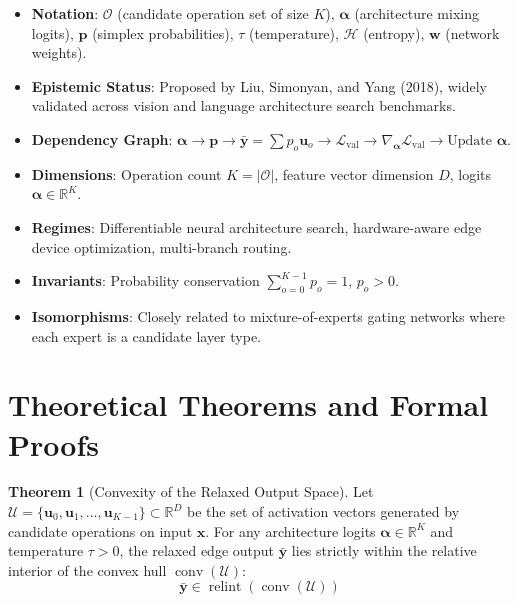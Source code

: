 \documentclass[11pt,a4paper]{article}
\theoremstyle{definition}
\newtheorem{theorem}{\textbf{Theorem}}[section]
\begin{document}
\begin{itemize}
    \item \textbf{Notation}: $\mathcal{O}$ (candidate operation set of size $K$), $\boldsymbol{\alpha}$ (architecture mixing logits), $\mathbf{p}$ (simplex probabilities), $\tau$ (temperature), $\mathcal{H}$ (entropy), $\mathbf{w}$ (network weights).
    \item \textbf{Epistemic Status}: Proposed by Liu, Simonyan, and Yang (2018), widely validated across vision and language architecture search benchmarks.
    \item \textbf{Dependency Graph}: $\boldsymbol{\alpha} \to \mathbf{p} \to \bar{\mathbf{y}} = \sum p_o \mathbf{u}_o \to \mathcal{L}_{\text{val}} \to \nabla_{\boldsymbol{\alpha}} \mathcal{L}_{\text{val}} \to \text{Update } \boldsymbol{\alpha}$.
    \item \textbf{Dimensions}: Operation count $K = |\mathcal{O}|$, feature vector dimension $D$, logits $\boldsymbol{\alpha} \in \mathbb{R}^K$.
    \item \textbf{Regimes}: Differentiable neural architecture search, hardware-aware edge device optimization, multi-branch routing.
    \item \textbf{Invariants}: Probability conservation $\sum_{o=0}^{K-1} p_o = 1$, $p_o > 0$.
    \item \textbf{Isomorphisms}: Closely related to mixture-of-experts gating networks where each expert is a candidate layer type.
\end{itemize}

\section{Theoretical Theorems and Formal Proofs}

\begin{theorem}[Convexity of the Relaxed Output Space]
Let $\mathcal{U} = \{\mathbf{u}_0, \mathbf{u}_1, \dots, \mathbf{u}_{K-1}\} \subset \mathbb{R}^D$ be the set of activation vectors generated by candidate operations on input $\mathbf{x}$. For any architecture logits $\boldsymbol{\alpha} \in \mathbb{R}^K$ and temperature $\tau > 0$, the relaxed edge output $\bar{\mathbf{y}}$ lies strictly within the relative interior of the convex hull $\operatorname{conv}(\mathcal{U})$:
{\boldmath
\begin{equation}
\bar{\mathbf{y}} \in \operatorname{relint}(\operatorname{conv}(\mathcal{U}))
\end{equation}
}
\end{theorem}
\end{document}
